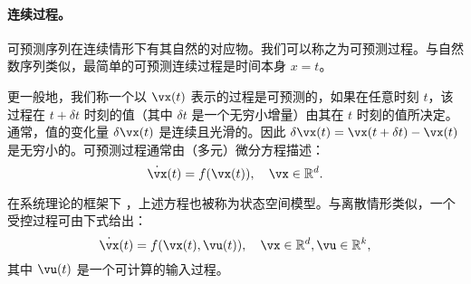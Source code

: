 \documentclass[../../book-main.tex]{subfiles}
\begin{document}

\paragraph{连续过程。}
可预测序列在连续情形下有其自然的对应物。我们可以称之为可预测过程。与自然数序列类似，最简单的可预测连续过程是时间本身 $x=t$。

更一般地，我们称一个以 $\vx(t)$ 表示的过程是可预测的，如果在任意时刻 $t$，该过程在 $t+\delta t$ 时刻的值（其中 $\delta t$ 是一个无穷小增量）由其在 $t$ 时刻的值所决定。通常，值的变化量 $\delta \vx(t)$ 是连续且光滑的。因此 $\delta \vx(t) = \vx(t + \delta t) - \vx(t)$ 是无穷小的。可预测过程通常由（多元）微分方程描述：
\begin{equation}
    \dot{\vx}(t) = f(\vx(t)), \quad \vx \in \mathbb{R}^d. 
    \label{eqn:process}
\end{equation}

在系统理论的框架下 \cite{Cal:Des,Sastry-Nonlinear}，上述方程也被称为状态空间模型。与离散情形类似，一个受控过程可由下式给出：
\begin{equation}
    \dot{\vx}(t) = f(\vx(t), \vu(t) ), \quad \vx \in \mathbb{R}^d, \vu \in \mathbb{R}^k,
    \label{eqn:process-controlled}
\end{equation}
其中 $\vu(t)$ 是一个可计算的输入过程。
\end{document}
